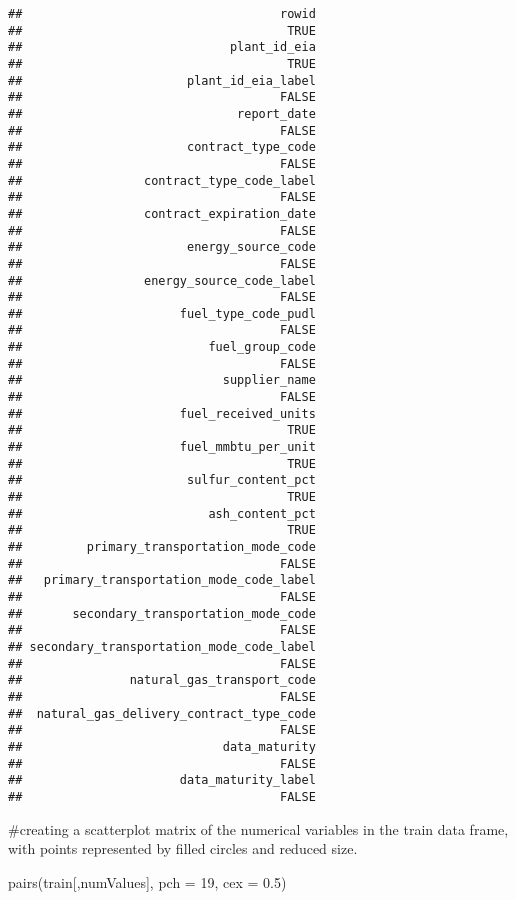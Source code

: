 \documentclass[
]{article}
\newenvironment{Shaded}{\begin{snugshade}}{\end{snugshade}}
\newcommand{\AttributeTok}[1]{\textcolor[rgb]{0.77,0.63,0.00}{#1}}
\newcommand{\DecValTok}[1]{\textcolor[rgb]{0.00,0.00,0.81}{#1}}
\newcommand{\FloatTok}[1]{\textcolor[rgb]{0.00,0.00,0.81}{#1}}
\newcommand{\FunctionTok}[1]{\textcolor[rgb]{0.00,0.00,0.00}{#1}}
\newcommand{\NormalTok}[1]{#1}
\begin{document}
\begin{verbatim}
##                                    rowid 
##                                     TRUE 
##                             plant_id_eia 
##                                     TRUE 
##                       plant_id_eia_label 
##                                    FALSE 
##                              report_date 
##                                    FALSE 
##                       contract_type_code 
##                                    FALSE 
##                 contract_type_code_label 
##                                    FALSE 
##                 contract_expiration_date 
##                                    FALSE 
##                       energy_source_code 
##                                    FALSE 
##                 energy_source_code_label 
##                                    FALSE 
##                      fuel_type_code_pudl 
##                                    FALSE 
##                          fuel_group_code 
##                                    FALSE 
##                            supplier_name 
##                                    FALSE 
##                      fuel_received_units 
##                                     TRUE 
##                      fuel_mmbtu_per_unit 
##                                     TRUE 
##                       sulfur_content_pct 
##                                     TRUE 
##                          ash_content_pct 
##                                     TRUE 
##         primary_transportation_mode_code 
##                                    FALSE 
##   primary_transportation_mode_code_label 
##                                    FALSE 
##       secondary_transportation_mode_code 
##                                    FALSE 
## secondary_transportation_mode_code_label 
##                                    FALSE 
##               natural_gas_transport_code 
##                                    FALSE 
##  natural_gas_delivery_contract_type_code 
##                                    FALSE 
##                            data_maturity 
##                                    FALSE 
##                      data_maturity_label 
##                                    FALSE
\end{verbatim}

\#creating a scatterplot matrix of the numerical variables in the train
data frame, with points represented by filled circles and reduced size.

\begin{Shaded}
\begin{Highlighting}[]
\FunctionTok{pairs}\NormalTok{(train[,numValues], }\AttributeTok{pch =} \DecValTok{19}\NormalTok{, }\AttributeTok{cex =} \FloatTok{0.5}\NormalTok{)}
\end{Highlighting}
\end{Shaded}
\end{document}
